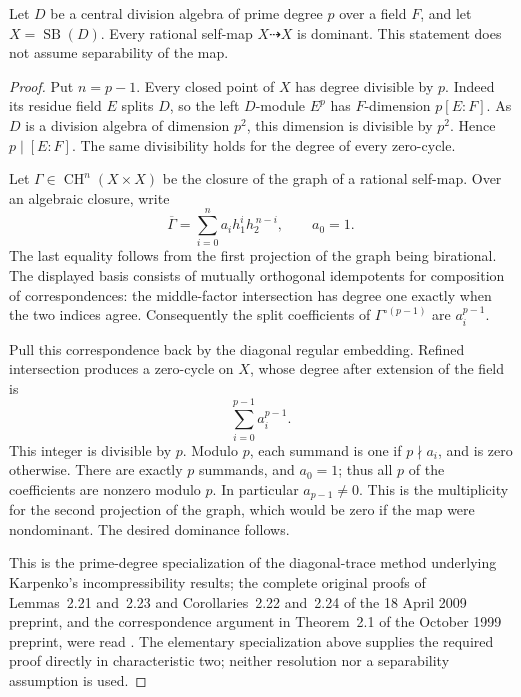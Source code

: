 \begin{lemma}
\label{lem:prime-Severi-Brauer-diagonal-trace}
Let \(D\) be a central division algebra of prime degree \(p\)
over a field \(F\), and let \(X=\operatorname{SB}(D)\).
Every rational self-map \(X\dashrightarrow X\) is dominant.
This statement does not assume separability of the map.
\end{lemma}
\begin{proof}
Put \(n=p-1\). Every closed point of \(X\) has degree divisible
by \(p\). Indeed its residue field \(E\) splits \(D\), so the
left \(D\)-module \(E^p\) has \(F\)-dimension \(p[E:F]\).
As \(D\) is a division algebra of dimension \(p^2\), this
dimension is divisible by \(p^2\). Hence \(p\mid[E:F]\).
The same divisibility holds for the degree of every zero-cycle.

Let \(\Gamma\in\operatorname{CH}^n(X\times X)\) be the closure
of the graph of a rational self-map. Over an algebraic closure,
write
\[
 \overline\Gamma=\sum_{i=0}^{n}a_i h_1^i h_2^{\,n-i},
                 \qquad a_0=1.                 \tag{PHR7}
\]
The last equality follows from the first projection of the graph
being birational. The displayed basis consists of mutually
orthogonal idempotents for composition of correspondences:
the middle-factor intersection has degree one exactly when
the two indices agree. Consequently the split coefficients of
\(\Gamma^{\circ(p-1)}\) are \(a_i^{p-1}\).

Pull this correspondence back by the diagonal regular embedding.
Refined intersection produces a zero-cycle on \(X\), whose
degree after extension of the field is
\[
                         \sum_{i=0}^{p-1}a_i^{p-1}.
                                                        \tag{PHR8}
\]
This integer is divisible by \(p\). Modulo \(p\), each summand
is one if \(p\nmid a_i\), and is zero otherwise. There are
exactly \(p\) summands, and \(a_0=1\); thus all \(p\) of the
coefficients are nonzero modulo \(p\). In particular
\(a_{p-1}\ne0\). This is the multiplicity for the second
projection of the graph, which would be zero if the map were
nondominant. The desired dominance follows.

This is the prime-degree specialization of the diagonal-trace
method underlying Karpenko's incompressibility results; the
complete original proofs of Lemmas~2.21 and~2.23 and Corollaries~2.22 and~2.24
of the 18 April 2009 preprint, and the correspondence argument
in Theorem~2.1 of the October 1999 preprint, were read
\citep{Karpenko2009UpperMotives,Karpenko1999Anisotropy}. The elementary
specialization above supplies the required proof directly in
characteristic two; neither resolution nor a separability
assumption is used.
\end{proof}

